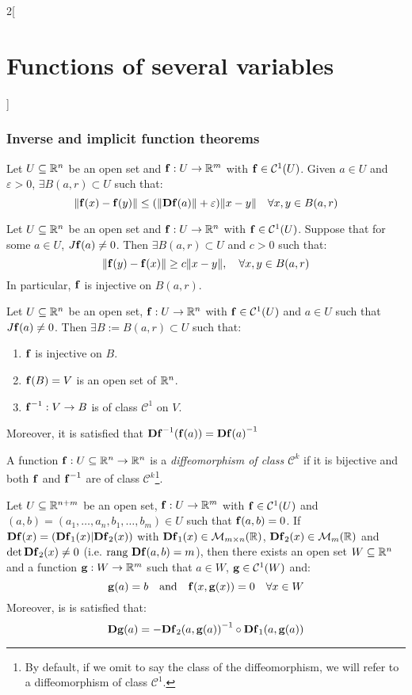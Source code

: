 \documentclass[../../../main.tex]{subfiles}
\begin{document}
\begin{multicols}{2}[\section{Functions of several variables}]
  \subsubsection{Inverse and implicit function theorems}
  \begin{lemma}
    Let $U\subseteq\mathbb{R}^n$ be an open set and $\boldsymbol{\mathrm{f}}:U\rightarrow\mathbb{R}^m$ with $\boldsymbol{\mathrm{f}}\in \mathcal{C}^1(U)$. Given $a\in U$ and $\varepsilon>0$, $\exists B(a,r)\subset U$ such that: $$\|\boldsymbol{\mathrm{f}}(x)-\boldsymbol{\mathrm{f}}(y)\|\leq(\|\boldsymbol{\mathrm{Df}}(a)\|+\varepsilon)\|x-y\|\quad\forall x,y\in B(a,r)$$
  \end{lemma}
  \begin{lemma}
    Let $U\subseteq\mathbb{R}^n$ be an open set and $\boldsymbol{\mathrm{f}}:U\rightarrow\mathbb{R}^n$ with $\boldsymbol{\mathrm{f}}\in \mathcal{C}^1(U)$. Suppose that for some $a\in U$, $J\boldsymbol{\mathrm{f}}(a)\ne 0$. Then $\exists B(a,r)\subset U$ and $c>0$ such that: $$\|\boldsymbol{\mathrm{f}}(y)-\boldsymbol{\mathrm{f}}(x)\|\geq c\|x-y\|,\quad\forall x,y\in B(a,r)$$ In particular, $\boldsymbol{\mathrm{f}}$ is injective on $B(a,r)$.
  \end{lemma}
  \begin{theorem}
    Let $U\subseteq\mathbb{R}^n$ be an open set, $\boldsymbol{\mathrm{f}}:U\rightarrow\mathbb{R}^n$ with $\boldsymbol{\mathrm{f}}\in \mathcal{C}^1(U)$ and $a\in U$ such that $J\boldsymbol{\mathrm{f}}(a)\ne0$. Then $\exists B:=B(a,r)\subset U$ such that:
    \begin{enumerate}
      \item $\boldsymbol{\mathrm{f}}$ is injective on $B$.
      \item $\boldsymbol{\mathrm{f}}(B)=V$ is an open set of $\mathbb{R}^n$.
      \item $\boldsymbol{\mathrm{f}}^{-1}:V\rightarrow B$ is of class $\mathcal{C}^1$ on $V$.
    \end{enumerate} Moreover, it is satisfied that $\boldsymbol{\mathrm{D}}{\boldsymbol{\mathrm{f}}}^{-1}(\boldsymbol{\mathrm{f}}(a))={\boldsymbol{\mathrm{Df}}(a)}^{-1}$
  \end{theorem}
  \begin{definition}
    A function $\boldsymbol{\mathrm{f}}:U\subseteq\mathbb{R}^n\rightarrow\mathbb{R}^n$ is a \textit{diffeomorphism of class $\mathcal{C}^k$} if it is bijective and both $\boldsymbol{\mathrm{f}}$ and $\boldsymbol{\mathrm{f}}^{-1}$ are of class $\mathcal{C}^k$\footnote{By default, if we omit to say the class of the diffeomorphism, we will refer to a diffeomorphism of class $\mathcal{C}^1$.}.
  \end{definition}
  \begin{theorem}
    Let $U\subseteq\mathbb{R}^{n+m}$ be an open set, $\boldsymbol{\mathrm{f}}:U\rightarrow\mathbb{R}^m$ with $\boldsymbol{\mathrm{f}}\in \mathcal{C}^1(U)$ and $(a,b)=(a_1,\ldots,a_n,b_1,\ldots,b_m)\in U$ such that $\boldsymbol{\mathrm{f}}(a,b)=0$. If $\boldsymbol{\mathrm{D}}\boldsymbol{\mathrm{f}}(x)=(\boldsymbol{\mathrm{D}}\boldsymbol{\mathrm{f}}_1(x)|\boldsymbol{\mathrm{D}}\boldsymbol{\mathrm{f}}_2(x))$ with $\boldsymbol{\mathrm{D}}\boldsymbol{\mathrm{f}}_1(x)\in\mathcal{M}_{m\times n}(\mathbb{R} )$, $\boldsymbol{\mathrm{D}}\boldsymbol{\mathrm{f}}_2(x)\in\mathcal{M}_m(\mathbb{R} )$ and $\det \boldsymbol{\mathrm{Df}}_2(x)\ne 0$ (i.e. $\text{rang }\boldsymbol{\mathrm{Df}}(a,b)=m$), then there exists an open set $W\subseteq\mathbb{R}^n$ and a function $\boldsymbol{\mathrm{g}}:W\rightarrow\mathbb{R}^m$ such that $a\in W$, $\boldsymbol{\mathrm{g}}\in\mathcal{C}^1(W)$ and: $$\boldsymbol{\mathrm{g}}(a)=b\quad\text{and}\quad \boldsymbol{\mathrm{f}}(x,\boldsymbol{\mathrm{g}}(x))=0\quad\forall x\in W$$ Moreover, is is satisfied that: $$\boldsymbol{\mathrm{Dg}}(a)=-{\boldsymbol{\mathrm{Df}}_2(a,\boldsymbol{\mathrm{g}}(a))}^{-1}\circ \boldsymbol{\mathrm{Df}}_1(a,\boldsymbol{\mathrm{g}}(a))$$
  \end{theorem}

\end{multicols}
\end{document}

